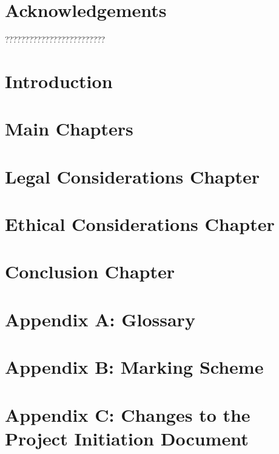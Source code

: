 \documentclass[journal, draftcls]{IEEEtran}
\begin{document}
\newpage %

\begin{abstract}
\end{abstract}

\section*{Acknowledgements}
?????????????????????????

\clearpage %

\tableofcontents
\clearpage %

\listoffigures
\clearpage %

\listoftables
\clearpage %

\section{Introduction}

\section*{Main Chapters}

\section*{Legal Considerations Chapter}

\section*{Ethical Considerations Chapter}

\section*{Conclusion Chapter}




\section*{Appendix A: Glossary}
\section*{Appendix B: Marking Scheme}
\section*{Appendix C: Changes to the Project Initiation Document}
\end{document}
